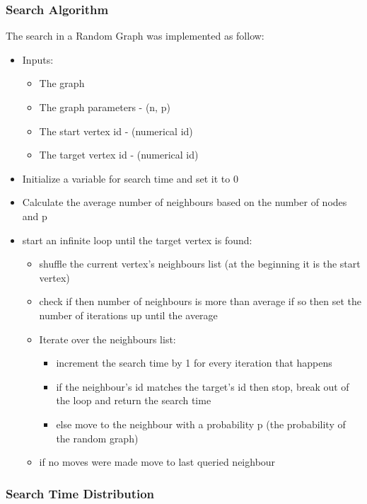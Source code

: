\documentclass[11pt,a4paper,notitlepage]{article}
\begin{document}
\subsubsection*{Search Algorithm}
The search in a Random Graph was implemented as follow:
\begin{itemize}
    \item Inputs:
    \begin{itemize}
        \item The graph
        \item The graph parameters - (n, p)
        \item The start vertex id - (numerical id)
        \item The target vertex id - (numerical id)
    \end{itemize}
    \item Initialize a variable for search time and set it to 0
    \item Calculate the average number of neighbours based on the number of nodes and p
    \item start an infinite loop until the target vertex is found:
    \begin{itemize}
        \item shuffle the current vertex's neighbours list (at the beginning it is the start vertex)
        \item check if then number of neighbours is more than average if so then set the number of iterations up until the average
        \item Iterate over the neighbours list:
        \begin{itemize}
            \item increment the search time by 1 for every iteration that happens
            \item if the neighbour's id matches the target's id then stop, break out of the loop and return the search time
            \item else move to the neighbour with a probability p (the probability of the random graph)
        \end{itemize}
        \item if no moves were made move to last queried neighbour
    \end{itemize}
\end{itemize}
\subsubsection*{Search Time Distribution}
\end{document}
